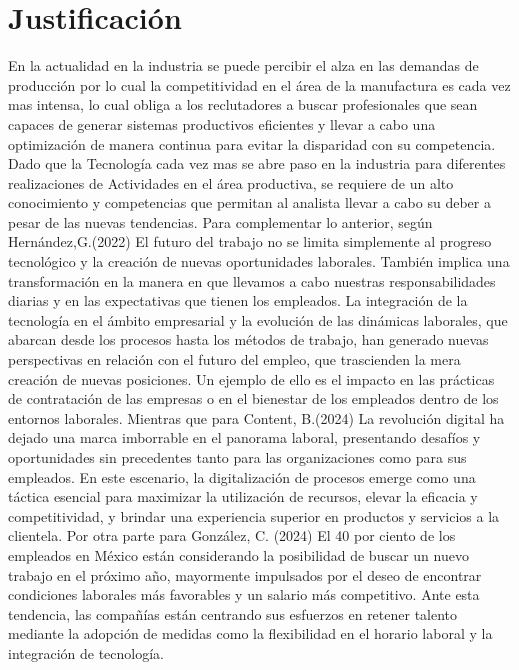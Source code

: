     \section{Justificación}
    En la actualidad en la industria se puede percibir el alza en las demandas de producción por lo cual la competitividad en el área de la manufactura es cada vez mas intensa, lo cual obliga a los reclutadores a buscar profesionales que sean capaces de generar sistemas productivos eficientes y llevar a cabo una optimización de manera continua para evitar la disparidad con su competencia.
    Dado que la Tecnología cada vez mas se abre paso en la industria para diferentes realizaciones de Actividades en el área productiva, se requiere de un alto conocimiento y competencias que permitan al analista 
    llevar a cabo su deber a pesar de las nuevas tendencias.
    Para complementar lo anterior, según Hernández,G.(2022) El futuro del trabajo no se limita simplemente al progreso tecnológico y la creación de nuevas oportunidades laborales. También implica una transformación en la manera en que llevamos a cabo nuestras responsabilidades diarias y en las expectativas que tienen los empleados. La integración de la tecnología en el ámbito empresarial y la evolución de las dinámicas laborales, que abarcan desde los procesos hasta los métodos de trabajo, han generado nuevas perspectivas en relación con el futuro del empleo, que trascienden la mera creación de nuevas posiciones. Un ejemplo de ello es el impacto en las prácticas de contratación de las empresas o en el bienestar de los empleados dentro de los entornos laborales.\cite{REF4}
    Mientras que para Content, B.(2024) La revolución digital ha dejado una marca imborrable en el panorama laboral, presentando desafíos y oportunidades sin precedentes tanto para las organizaciones como para sus empleados. En este escenario, la digitalización de procesos emerge como una táctica esencial para maximizar la utilización de recursos, elevar la eficacia y competitividad, y brindar una experiencia superior en productos y servicios a la clientela.
    Por otra parte para González, C. (2024)
    El 40 por ciento de los empleados en México están considerando la posibilidad de buscar un nuevo trabajo en el próximo año, mayormente impulsados por el deseo de encontrar condiciones laborales más favorables y un salario más competitivo. Ante esta tendencia, las compañías están centrando sus esfuerzos en retener talento mediante la adopción de medidas como la flexibilidad en el horario laboral y la integración de tecnología.\cite{REF5}
